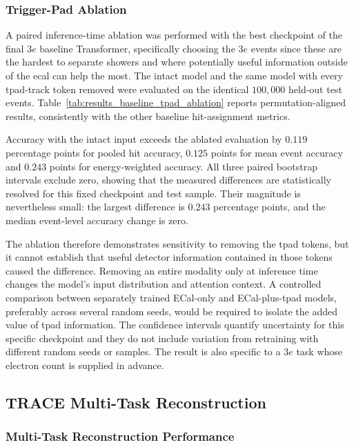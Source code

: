 \subsubsection{Trigger-Pad Ablation}

A paired inference-time ablation was performed with the best checkpoint of the
final \(3e\) baseline Transformer, specifically choosing the $3e$ events since these are the hardest to separate showers and where potentially useful information outside of the ecal can help the most. The intact model and the same
model with every \gls{tpad}-track token removed were evaluated on the
identical \(100{,}000\) held-out test events. Table~\ref{tab:results_baseline_tpad_ablation}
reports permutation-aligned results, consistently with the other baseline
hit-assignment metrics.



Accuracy with the intact input exceeds the ablated evaluation by \(0.119\)
percentage points for pooled hit accuracy, \(0.125\) points for mean event
accuracy and \(0.243\) points for energy-weighted accuracy. All three paired
bootstrap intervals exclude zero, showing that the measured differences are
statistically resolved for this fixed checkpoint and test sample. Their
magnitude is nevertheless small: the largest difference is \(0.243\)
percentage points, and the median event-level accuracy change is zero.


The ablation therefore demonstrates sensitivity to removing the \gls{tpad}
tokens, but it cannot establish that useful detector information contained in
those tokens caused the difference. Removing an entire modality only at
inference time changes the model's input distribution and attention context.
A controlled comparison between separately trained ECal-only and
ECal-plus-\gls{tpad} models, preferably across several random seeds, would be
required to isolate the added value of \gls{tpad} information. The confidence
intervals quantify uncertainty for this specific checkpoint and they
do not include variation from retraining with different random seeds or
samples. The result is also specific to a \(3e\) task whose electron count is supplied in advance.


\subsection{TRACE Multi-Task Reconstruction}

\subsubsection{Multi-Task Reconstruction Performance}

